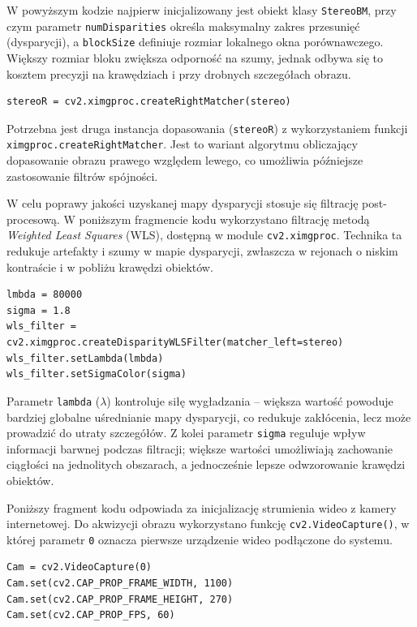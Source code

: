 \documentclass[magisterska]{pracadypl}
\begin{document}
W powyższym kodzie najpierw inicjalizowany jest obiekt klasy \texttt{StereoBM}, przy czym parametr \texttt{numDisparities} określa maksymalny zakres przesunięć (dysparycji), a \texttt{blockSize} definiuje rozmiar lokalnego okna porównawczego. Większy rozmiar bloku zwiększa odporność na szumy, jednak odbywa się to kosztem precyzji na krawędziach i przy drobnych szczegółach obrazu.  

\begin{lstlisting}[style=mypython]
stereoR = cv2.ximgproc.createRightMatcher(stereo)
\end{lstlisting}

Potrzebna jest druga instancja dopasowania (\texttt{stereoR}) z wykorzystaniem funkcji \texttt{ximgproc\allowbreak .createRightMatcher}. Jest to wariant algorytmu obliczający dopasowanie obrazu prawego względem lewego, co umożliwia późniejsze zastosowanie filtrów spójności. 

W celu poprawy jakości uzyskanej mapy dysparycji stosuje się filtrację post-procesową. W poniższym fragmencie kodu wykorzystano filtrację metodą \textit{Weighted Least Squares} (WLS), dostępną w module \texttt{cv2.ximgproc}. Technika ta redukuje artefakty i szumy w mapie dysparycji, zwłaszcza w rejonach o niskim kontraście i w pobliżu krawędzi obiektów.  

\begin{lstlisting}[style=mypython]
lmbda = 80000
sigma = 1.8
wls_filter = cv2.ximgproc.createDisparityWLSFilter(matcher_left=stereo)
wls_filter.setLambda(lmbda)
wls_filter.setSigmaColor(sigma)
\end{lstlisting}

Parametr \texttt{lambda} (\( \lambda \)) kontroluje siłę wygładzania – większa wartość powoduje bardziej globalne uśrednianie mapy dysparycji, co redukuje zakłócenia, lecz może prowadzić do utraty szczegółów. Z kolei parametr \texttt{sigma} reguluje wpływ informacji barwnej podczas filtracji; większe wartości umożliwiają zachowanie ciągłości na jednolitych obszarach, a jednocześnie lepsze odwzorowanie krawędzi obiektów.  

Poniższy fragment kodu odpowiada za inicjalizację strumienia wideo z kamery internetowej. Do akwizycji obrazu wykorzystano funkcję \texttt{cv2.VideoCapture()}, w której parametr \texttt{0} oznacza pierwsze urządzenie wideo podłączone do systemu.  

\begin{lstlisting}[style=mypython]
Cam = cv2.VideoCapture(0)
Cam.set(cv2.CAP_PROP_FRAME_WIDTH, 1100)  
Cam.set(cv2.CAP_PROP_FRAME_HEIGHT, 270)
Cam.set(cv2.CAP_PROP_FPS, 60)
\end{lstlisting}
\end{document}
